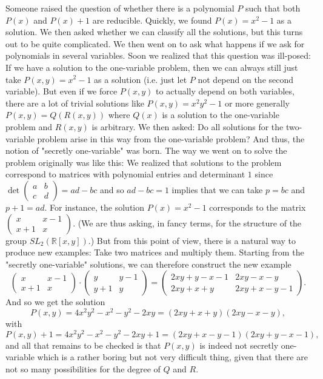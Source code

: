 \begin{solution}[name={Solution by Tintarn}]
	Someone raised the question of whether there is a polynomial $P$ such that both $P(x)$ and $P(x)+1$ are reducible. Quickly, we found $P(x)=x^2-1$ as a solution. We then asked whether we can classify all the solutions, but this turns out to be quite complicated.
	We then went on to ask what happens if we ask for polynomials in several variables. Soon we realized that this question was ill-posed: If we have a solution to the one-variable problem, then we can always still just take $P(x,y)=x^2-1$ as a solution (i.e. just let $P$ not depend on the second variable).
	But even if we force $P(x,y)$ to actually depend on both variables, there are a lot of trivial solutions like $P(x,y)=x^2y^2-1$ or more generally $P(x,y)=Q(R(x,y))$ where $Q(x)$ is a solution to the one-variable problem and $R(x,y)$ is arbitrary.
	We then asked: Do all solutions for the two-variable problem arise in this way from the one-variable problem? And thus, the notion of "secretly one-variable" was born.
	The way we went on to solve the problem originally was like this: We realized that solutions to the problem correspond to matrices with polynomial entries and determinant $1$ since $\det \begin{pmatrix} a & b\\c & d \end{pmatrix}=ad-bc$ and so $ad-bc=1$ implies that we can take $p=bc$ and $p+1=ad$. For instance, the solution $P(x)=x^2-1$ corresponds to the matrix $\begin{pmatrix} x & x-1\\x+1 & x \end{pmatrix}$.
	(We are thus asking, in fancy terms, for the structure of the group $SL_2(\mathbb{R}[x,y])$.)
	But from this point of view, there is a natural way to produce new examples: Take two matrices and multiply them.
	Starting from the "secretly one-variable" solutions, we can therefore construct the new example
	\[\begin{pmatrix} x & x-1\\x+1 & x \end{pmatrix} \cdot \begin{pmatrix} y & y-1\\y+1 & y \end{pmatrix}=\begin{pmatrix} 2xy+y-x-1 & 2xy-x-y\\2xy+x+y & 2xy+x-y-1 \end{pmatrix}.\]And so we get the solution
	\[P(x,y)=4x^2y^2-x^2-y^2-2xy=(2xy+x+y)(2xy-x-y),\]with
	\[P(x,y)+1=4x^2y^2-x^2-y^2-2xy+1=(2xy+x-y-1)(2xy+y-x-1),\]and all that remains to be checked is that $P(x,y)$ is indeed not secretly one-variable which is a rather boring but not very difficult thing, given that there are not so many possibilities for the degree of $Q$ and $R$.
\end{solution}



